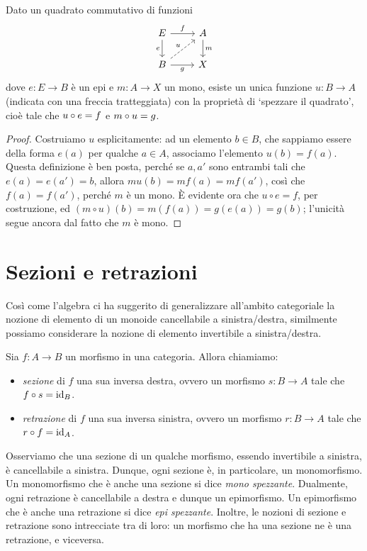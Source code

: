 \begin{proposition}
	Dato un quadrato commutativo di funzioni
	\[\begin{tikzcd}
			E \ar[r,"f"]\ar[d, "e"']& A\ar[d, "m"] \\
			B \ar[r, "g"']\ar[ur,dashed,"u"] & X
		\end{tikzcd}\]
	dove \(e : E\to B\) è un epi e \(m : A \to X\) un mono, esiste un unica funzione \(u : B\to A\) (indicata con una freccia tratteggiata) con la proprietà di `spezzare il quadrato', cioè tale che \(u\circ e=f\) e \(m\circ u=g\).
\end{proposition}
\begin{proof}
	Costruiamo \(u\) esplicitamente: ad un elemento \(b\in B\), che sappiamo essere della forma \(e(a)\) per qualche \(a\in A\), associamo l'elemento \(u(b)=f(a)\). Questa definizione è ben posta, perché se \(a,a'\) sono entrambi tali che \(e(a)=e(a')=b\), allora \(mu(b)=mf(a)=mf(a')\), così che \(f(a)=f(a')\), perché \(m\) è un mono. \`E evidente ora che \(u\circ e= f\), per costruzione, ed \((m\circ u)(b)=m(f(a))=g(e(a))=g(b)\); l'unicità segue ancora dal fatto che \(m\) è mono.
\end{proof}



\section{Sezioni e retrazioni}

Così come l'algebra ci ha suggerito di generalizzare all'ambito categoriale la nozione di elemento di un monoide cancellabile a sinistra/destra,
similmente possiamo considerare la nozione di elemento invertibile a sinistra/destra.

\begin{definition}
	Sia \(f \colon A \to B\) un morfismo in una categoria.
	Allora chiamiamo:
	\begin{itemize}
		\item \emph{sezione} di \(f\) una sua inversa destra, ovvero un morfismo \(s \colon B \to A\) tale che \(f \circ s = \mathrm{id}_{B}\).
		\item \emph{retrazione} di \(f\) una sua inversa sinistra, ovvero un morfismo \(r \colon B \to A\) tale che \(r \circ f = \mathrm{id}_{A}\).
	\end{itemize}
\end{definition}

Osserviamo che una sezione di un qualche morfismo, essendo invertibile a sinistra, è cancellabile a sinistra.
Dunque, ogni sezione è, in particolare, un monomorfismo.
Un monomorfismo che è anche una sezione si dice \emph{mono spezzante}.
Dualmente, ogni retrazione è cancellabile a destra e dunque un epimorfismo.
Un epimorfismo che è anche una retrazione si dice \emph{epi spezzante}.
Inoltre, le nozioni di sezione e retrazione sono intrecciate tra di loro:
un morfismo che ha una sezione ne è una retrazione,
e viceversa.

